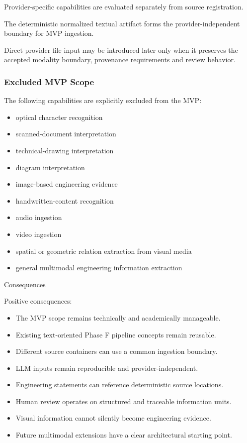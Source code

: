 Provider-specific capabilities are evaluated separately from source registration.

The deterministic normalized textual artifact forms the provider-independent boundary for MVP ingestion.

Direct provider file input may be introduced later only when it preserves the accepted modality boundary, provenance requirements and review behavior.

\hypertarget{excluded-mvp-scope}{%
\subsubsection{Excluded MVP Scope}\label{excluded-mvp-scope}}

The following capabilities are explicitly excluded from the MVP:

\begin{itemize}
\tightlist
\item
  optical character recognition
\item
  scanned-document interpretation
\item
  technical-drawing interpretation
\item
  diagram interpretation
\item
  image-based engineering evidence
\item
  handwritten-content recognition
\item
  audio ingestion
\item
  video ingestion
\item
  spatial or geometric relation extraction from visual media
\item
  general multimodal engineering information extraction
\end{itemize}

Consequences

Positive consequences:

\begin{itemize}
\tightlist
\item
  The MVP scope remains technically and academically manageable.
\item
  Existing text-oriented Phase F pipeline concepts remain reusable.
\item
  Different source containers can use a common ingestion boundary.
\item
  LLM inputs remain reproducible and provider-independent.
\item
  Engineering statements can reference deterministic source locations.
\item
  Human review operates on structured and traceable information units.
\item
  Visual information cannot silently become engineering evidence.
\item
  Future multimodal extensions have a clear architectural starting point.
\end{itemize}

